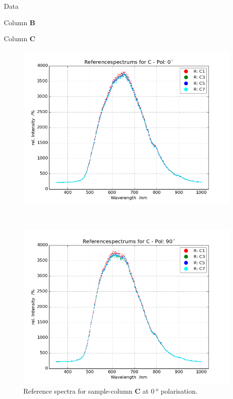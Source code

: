 \begin{appendix}
\begin{chapter}{Data}
\begin{section}{Column \textbf{B}}
    \end{section}
    
    
    
    \newpage
    \begin{section}{Column \textbf{C}}
      \label{Appendix:DataC}
      
      \begin{figure}[ht!]
        \centering
        \begin{minipage}{.92\textwidth}
          \centering
          \includegraphics[width=\textwidth]{Figures/Refspec_CPol0.png}
          \caption{Reference spectra for sample-column \textbf{C} at
              $\SI{0}{\degree}$ polarisation.}
          \label{fig:Refspec_CPol0}
        \end{minipage}\\
        \begin{minipage}{.92\textwidth}
          \centering
          \includegraphics[width=\textwidth]{Figures/Refspec_CPol90.png}

\end{minipage}
\end{figure}
\end{section}
\end{chapter}
\end{appendix}
